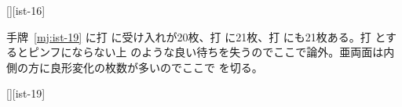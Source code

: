 \documentclass[../nankiru_main.tex]{subfiles}
\begin{document}
[][ist-16]

手牌~\ref{mj:ist-19} に打  に受け入れが20枚、打  に21枚、打  にも21枚ある。打  とするとピンフにならない上  のような良い待ちを失うのでここで論外。亜両面は内側の方に良形変化の枚数が多いのでここで  を切る。

[][ist-19]

%
%
%
%
\end{document}
